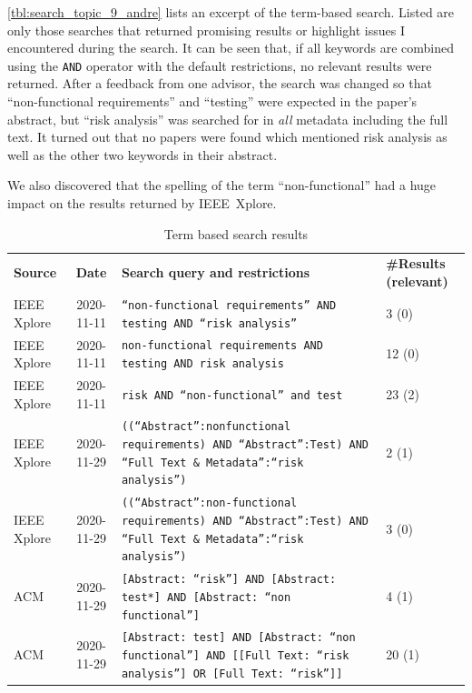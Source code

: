 \autoref{tbl:search_topic_9_andre} lists an excerpt of the term-based search.
Listed are only those searches that returned promising results or highlight issues I encountered during the search.
It can be seen that, if all keywords are combined using the \texttt{AND} operator with the default restrictions, no relevant results were returned.
After a feedback from one advisor, the search was changed so that \enquote{non-functional requirements} and \enquote{testing} were expected in the paper's abstract, but \enquote{risk analysis} was searched for in \textit{all} metadata including the full text.
It turned out that no papers were found which mentioned risk analysis as well as the other two keywords in their abstract.

We also discovered that the spelling of the term \enquote{non-functional} had a huge impact on the results returned by IEEE~Xplore.

\begin{small}
	\centering
	\begin{longtable}[h]{p{}|c|p{}|p{}}
		\caption{Term based search results}
		\label{tbl:search_topic_9_andre}
		\setlength{\tabcolsep}{1em}\\    %
		\hline
		\textbf{Source} & \textbf{Date} & \textbf{Search query and restrictions} & \textbf{\#Results (relevant)} \\
		
		\hline
		IEEE Xplore & 2020-11-11 & \texttt{\enquote{{}non-functional requirements}{} AND testing AND \enquote{{}risk analysis}{}} & 3 (0) \\
		
		\hline
		IEEE Xplore & 2020-11-11 & \texttt{non-functional requirements AND testing AND risk analysis} & 12 (0) \\
		
		\hline
		IEEE Xplore & 2020-11-11 & \texttt{risk AND \enquote{non-functional} and test} & 23 (2) \\
		
		\hline
		IEEE Xplore & 2020-11-29 & \texttt{((\enquote{{}Abstract}{}:nonfunctional requirements) AND \enquote{{}Abstract}{}:Test) AND \enquote{Full Text \& Metadata}:\enquote{{}risk analysis}{})} & 2 (1) \\
		
		\hline
		IEEE Xplore & 2020-11-29 & \texttt{((\enquote{{}Abstract}{}:non-functional requirements) AND \enquote{{}Abstract}{}:Test) AND \enquote{Full Text \& Metadata}:\enquote{{}risk analysis}{})} & 3 (0) \\

		\hline
		ACM & 2020-11-29 & \texttt{[Abstract: \enquote{{}risk}{}] AND [Abstract: test*] AND [Abstract: \enquote{{}non functional}{}]} & 4 (1) \\
		
		\hline
		ACM & 2020-11-29 & \texttt{[Abstract: test] AND [Abstract: \enquote{{}non functional}{}] AND [[Full Text: \enquote{{}risk analysis}{}] OR [Full Text: \enquote{{}risk}{}]]} & 20 (1) \\
		\hline
	\end{longtable}
\end{small}

